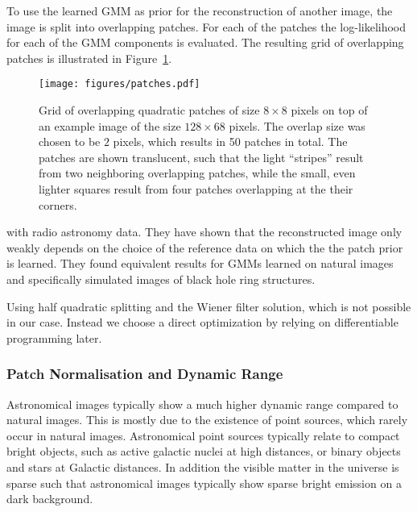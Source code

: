 \documentclass[twocolumn]{aastex631}
\begin{document}
    To use the learned GMM as prior for the reconstruction of another image, the image is split into overlapping patches. For each of the patches the log-likelihood for each of the GMM components is evaluated. The resulting grid of overlapping patches is illustrated in Figure~\ref{fig:patches}.

    \begin{figure}
        \begin{centering}
            \texttt{[image: figures/patches.pdf]}
            \caption{
                Grid of overlapping quadratic patches of size $8\times8$ pixels on top of an example image of the size $128 \times 68$ pixels. The overlap size was chosen to be $2$ pixels, which results in 50 patches in total. The patches are shown translucent, such that the light \enquote{stripes} result from two neighboring overlapping patches, while the small, even lighter squares result from four patches overlapping at the their corners.
            }
            \label{fig:patches}
        \end{centering}
    \end{figure}

    with radio astronomy data. They have shown that the reconstructed image only weakly depends on the choice of the reference data on which the the patch prior is learned. They found equivalent results for GMMs learned on natural images and specifically simulated images of black hole ring structures.

    Using half quadratic splitting and the Wiener filter solution, which is not possible in our case. Instead we choose a direct optimization by relying on differentiable programming later. 
    

    \subsubsection{Patch Normalisation and Dynamic Range}
    Astronomical images typically show a much higher dynamic range compared to natural images. This is mostly due to the existence of point sources, which rarely occur in natural images. Astronomical point sources typically relate to compact bright objects, such as active galactic nuclei at high distances, or binary objects and stars at Galactic distances. In addition the visible matter in the universe is sparse such that astronomical images typically show sparse bright emission on a dark background. 
\end{document}
